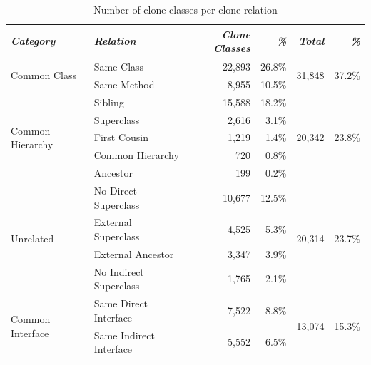\begin{table}[H]
\centering
\begin{tabular}{@{}llrrrr@{}}
\toprule
\textit{\textbf{Category}} & \textit{\textbf{Relation}} & \textit{\textbf{Clone Classes}} & \textit{\textbf{\%}} & \textit{\textbf{Total}} & \textit{\textbf{\%}} \\ \midrule
\multirow{2}{*}{Common Class} & Same Class & 22,893 & 26.8\% & \multirow{2}{*}{31,848} & \multirow{2}{*}{37.2\%} \\ \cmidrule(lr){2-4}
 & Same Method & 8,955 & 10.5\% & & \\ \midrule
\multirow{5}{*}{Common Hierarchy} & Sibling & 15,588 & 18.2\% & \multirow{5}{*}{20,342}& \multirow{5}{*}{23.8\%} \\ \cmidrule(lr){2-4}
 & Superclass & 2,616 & 3.1\% & & \\ \cmidrule(lr){2-4}
 & First Cousin & 1,219 & 1.4\% & & \\ \cmidrule(lr){2-4}
 & Common Hierarchy & 720 & 0.8\% & & \\ \cmidrule(lr){2-4}
 & Ancestor & 199 & 0.2\% & & \\ \midrule
\multirow{4}{*}{Unrelated} & No Direct Superclass & 10,677 & 12.5\% & \multirow{4}{*}{20,314}& \multirow{4}{*}{23.7\%} \\ \cmidrule(lr){2-4}
 & External Superclass & 4,525 & 5.3\% & & \\ \cmidrule(lr){2-4}
 & External Ancestor & 3,347 & 3.9\% & & \\ \cmidrule(lr){2-4}
 & No Indirect Superclass & 1,765 & 2.1\% & & \\ \midrule
\multirow{2}{*}{Common Interface} & Same Direct Interface & 7,522 & 8.8\% & \multirow{2}{*}{13,074} & \multirow{2}{*}{15.3\%} \\ \cmidrule(lr){2-4}
 & Same Indirect Interface & 5,552 & 6.5\% & & \\ \bottomrule
\end{tabular}
\caption{Number of clone classes per clone relation}
\label{tab:relation}
\end{table}

